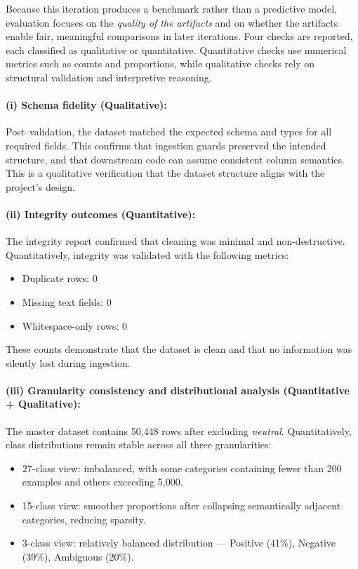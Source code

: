 Because this iteration produces a benchmark rather than a predictive model, evaluation focuses on the \emph{quality of the artifacts} and on whether the artifacts enable fair, meaningful comparisons in later iterations. Four checks are reported, each classified as qualitative or quantitative. Quantitative checks use numerical metrics such as counts and proportions, while qualitative checks rely on structural validation and interpretive reasoning.

\paragraph{(i) Schema fidelity (Qualitative):}
Post--validation, the dataset matched the expected schema and types for all required fields. This confirms that ingestion guards preserved the intended structure, and that downstream code can assume consistent column semantics. This is a qualitative verification that the dataset structure aligns with the project’s design.

\paragraph{(ii) Integrity outcomes (Quantitative):}
The integrity report confirmed that cleaning was minimal and non-destructive. Quantitatively, integrity was validated with the following metrics:
\begin{itemize}
    \item Duplicate rows: $0$
    \item Missing text fields: $0$
    \item Whitespace-only rows: $0$
\end{itemize}
These counts demonstrate that the dataset is clean and that no information was silently lost during ingestion.

\paragraph{(iii) Granularity consistency and distributional analysis (Quantitative + Qualitative):}
The master dataset contains 50{,}448 rows after excluding \emph{neutral}. Quantitatively, class distributions remain stable across all three granularities:
\begin{itemize}
    \item 27-class view: imbalanced, with some categories containing fewer than 200 examples and others exceeding 5{,}000.
    \item 15-class view: smoother proportions after collapsing semantically adjacent categories, reducing sparsity.
    \item 3-class view: relatively balanced distribution --- Positive (41\%), Negative (39\%), Ambiguous (20\%).
\end{itemize}

